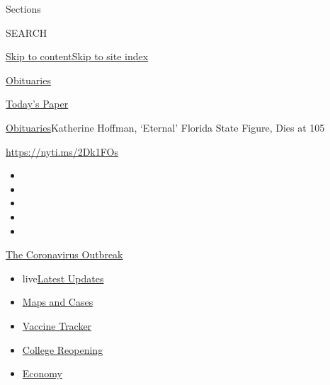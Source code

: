 Sections

SEARCH

\protect\hyperlink{site-content}{Skip to
content}\protect\hyperlink{site-index}{Skip to site index}

\href{https://www.nytimes.com/section/obituaries}{Obituaries}

\href{https://myaccount.nytimes.com/auth/login?response_type=cookie\&client_id=vi}{}

\href{https://www.nytimes.com/section/todayspaper}{Today's Paper}

\href{/section/obituaries}{Obituaries}\textbar{}Katherine Hoffman,
`Eternal' Florida State Figure, Dies at 105

\url{https://nyti.ms/2Dk1FOs}

\begin{itemize}
\item
\item
\item
\item
\item
\end{itemize}

\href{https://www.nytimes.com/news-event/coronavirus?action=click\&pgtype=Article\&state=default\&region=TOP_BANNER\&context=storylines_menu}{The
Coronavirus Outbreak}

\begin{itemize}
\tightlist
\item
  live\href{https://www.nytimes.com/2020/08/03/world/coronavirus-covid-19.html?action=click\&pgtype=Article\&state=default\&region=TOP_BANNER\&context=storylines_menu}{Latest
  Updates}
\item
  \href{https://www.nytimes.com/interactive/2020/us/coronavirus-us-cases.html?action=click\&pgtype=Article\&state=default\&region=TOP_BANNER\&context=storylines_menu}{Maps
  and Cases}
\item
  \href{https://www.nytimes.com/interactive/2020/science/coronavirus-vaccine-tracker.html?action=click\&pgtype=Article\&state=default\&region=TOP_BANNER\&context=storylines_menu}{Vaccine
  Tracker}
\item
  \href{https://www.nytimes.com/2020/08/02/us/covid-college-reopening.html?action=click\&pgtype=Article\&state=default\&region=TOP_BANNER\&context=storylines_menu}{College
  Reopening}
\item
  \href{https://www.nytimes.com/live/2020/08/03/business/stock-market-today-coronavirus?action=click\&pgtype=Article\&state=default\&region=TOP_BANNER\&context=storylines_menu}{Economy}
\end{itemize}

